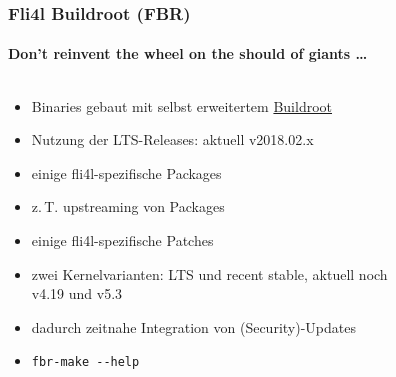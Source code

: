 \documentclass[t]{beamer}
\newcommand{\dashdash}[1]{-\hspace{0pt}-#1}
\begin{document}
\begin{frame}
    \frametitle{Fli4l Buildroot (FBR)}
    \framesubtitle{Don't reinvent the wheel on the should of giants …}
    \begin{columns}[T,onlytextwidth]
        \begin{column}{0.65\textwidth}
            \begin{itemize}
                \item Binaries gebaut mit selbst erweitertem \href{https://buildroot.org/}{Buildroot}
                \item Nutzung der LTS-Releases: aktuell v2018.02.x
                \item einige fli4l-spezifische Packages
                \item z.\,T. upstreaming von Packages
                \item einige fli4l-spezifische Patches
                \item zwei Kernelvarianten: LTS und recent stable, aktuell noch v4.19 und v5.3
                \item dadurch zeitnahe Integration von (Security)-Updates
                \item \texttt{fbr-make \dashdash{help}}
            \end{itemize}
        \end{column}
        \begin{column}{0.35\textwidth}
            \begin{figure}
            \end{figure}
        \end{column}
    \end{columns}
\end{frame}
\end{document}
